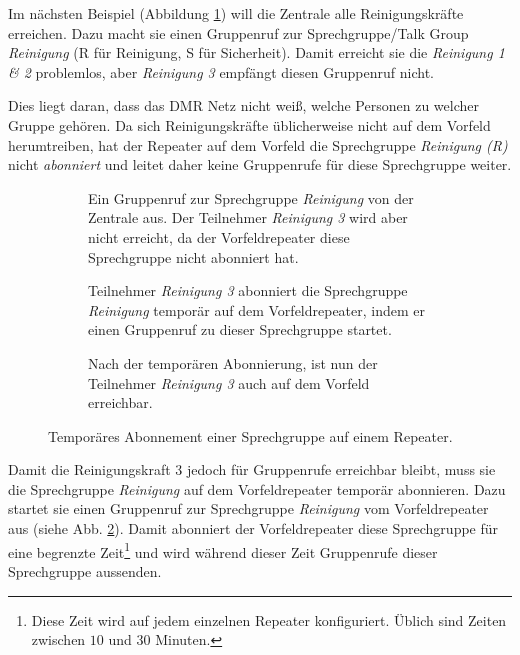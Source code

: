 Im nächsten Beispiel (Abbildung \ref{fig:exnet3}) will die Zentrale alle Reinigungskräfte erreichen. Dazu macht sie einen Gruppenruf zur Sprechgruppe/Talk Group \emph{Reinigung} (R für Reinigung, S für Sicherheit). Damit erreicht sie die \emph{Reinigung 1 \& 2} problemlos, aber \emph{Reinigung 3} empfängt diesen Gruppenruf nicht. 

Dies liegt daran, dass das DMR Netz nicht weiß, welche Personen zu welcher Gruppe gehören. Da sich Reinigungskräfte üblicherweise nicht auf dem Vorfeld herumtreiben, hat der Repeater auf dem Vorfeld die Sprechgruppe \emph{Reinigung (R)} nicht \emph{abonniert} und leitet daher keine Gruppenrufe für diese Sprechgruppe weiter. 

\begin{figure}[p]
 \begin{subfigure}{\linewidth}
  \centering
  
  \caption{Ein Gruppenruf zur Sprechgruppe \emph{Reinigung} von der Zentrale aus. Der Teilnehmer \emph{Reinigung 3} wird aber nicht erreicht, da der Vorfeldrepeater diese Sprechgruppe nicht abonniert hat.} \label{fig:exnet3}
 \end{subfigure}\vspace{0.5cm}
 \begin{subfigure}{\linewidth}
  \centering
  
  \caption{Teilnehmer \emph{Reinigung 3} abonniert die Sprechgruppe \emph{Reinigung} temporär auf dem Vorfeldrepeater, indem er einen Gruppenruf zu dieser Sprechgruppe startet.} \label{fig:exnet4a} 
 \end{subfigure}\vspace{.5cm}
 \begin{subfigure}{\linewidth}
  \centering
  
  \caption{Nach der temporären Abonnierung, ist nun der Teilnehmer \emph{Reinigung 3} auch auf dem Vorfeld erreichbar.} \label{fig:exnet4b}
 \end{subfigure}
 \caption{Temporäres Abonnement einer Sprechgruppe auf einem Repeater.} \label{fig:exnet4}
\end{figure}

Damit die Reinigungskraft 3 jedoch für Gruppenrufe erreichbar bleibt, muss sie die Sprechgruppe \emph{Reinigung} auf dem Vorfeldrepeater temporär abonnieren. Dazu startet sie einen Gruppenruf zur Sprechgruppe \emph{Reinigung} vom Vorfeldrepeater aus (siehe Abb. \ref{fig:exnet4a}). Damit abonniert der Vorfeldrepeater diese Sprechgruppe für eine begrenzte Zeit\footnote{Diese Zeit wird auf jedem einzelnen Repeater konfiguriert. Üblich sind Zeiten zwischen $10$ und $30$ Minuten.} und wird während dieser Zeit Gruppenrufe dieser Sprechgruppe aussenden. 

